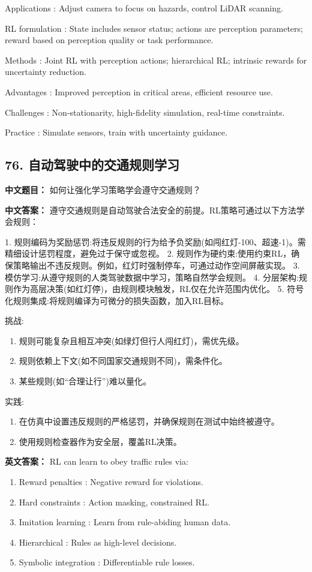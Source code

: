 \documentclass[10pt,a4paper]{ctexart}
\begin{document}
 Applications : Adjust camera to focus on hazards, control LiDAR scanning.

 RL formulation : State includes sensor status; actions are perception parameters; reward based on perception quality or task performance.

 Methods : Joint RL with perception actions; hierarchical RL; intrinsic rewards for uncertainty reduction.

 Advantages : Improved perception in critical areas, efficient resource use.

 Challenges : Non-stationarity, high-fidelity simulation, real-time constraints.

 Practice : Simulate sensors, train with uncertainty guidance.

\subsection*{76. 自动驾驶中的交通规则学习}
\textbf{中文题目：} 如何让强化学习策略学会遵守交通规则？

\textbf{中文答案：}  
遵守交通规则是自动驾驶合法安全的前提。RL策略可通过以下方法学会规则：

1.  规则编码为奖励惩罚:将违反规则的行为给予负奖励(如闯红灯-100、超速-1)。需精细设计惩罚程度，避免过于保守或忽视。
2.  规则作为硬约束:使用约束RL，确保策略输出不违反规则。例如，红灯时强制停车，可通过动作空间屏蔽实现。
3.  模仿学习:从遵守规则的人类驾驶数据中学习，策略自然学会规则。
4.  分层架构:规则作为高层决策(如红灯停)，由规则模块触发，RL仅在允许范围内优化。
5.  符号化规则集成:将规则编译为可微分的损失函数，加入RL目标。

 挑战:
\begin{enumerate}
    \item 规则可能复杂且相互冲突(如绿灯但行人闯红灯)，需优先级。
    \item 规则依赖上下文(如不同国家交通规则不同)，需条件化。
    \item 某些规则(如“合理让行”)难以量化。
\end{enumerate}

 实践:
\begin{enumerate}
    \item 在仿真中设置违反规则的严格惩罚，并确保规则在测试中始终被遵守。
    \item 使用规则检查器作为安全层，覆盖RL决策。
\end{enumerate}

\textbf{英文答案：}  
RL can learn to obey traffic rules via:
\begin{enumerate}
    \item Reward penalties : Negative reward for violations.
    \item Hard constraints : Action masking, constrained RL.
    \item Imitation learning : Learn from rule-abiding human data.
    \item Hierarchical : Rules as high-level decisions.
    \item Symbolic integration : Differentiable rule losses.
\end{enumerate}
\end{document}
